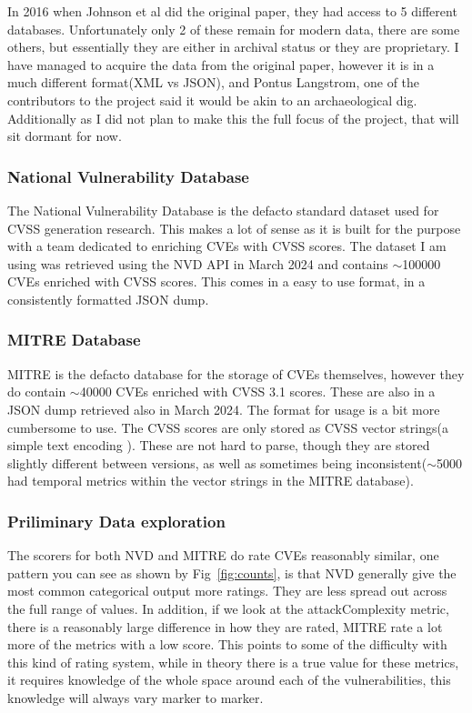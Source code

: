 \documentclass[12pt]{article}
\begin{document}
In 2016 when Johnson et al \cite{bayes} did the original paper, they had access to 5 different
databases. Unfortunately only 2 of these remain for modern data, there are some others, but
essentially they are either in archival status or they are proprietary. I have managed to acquire
the data from the original paper, however it is in a much different format(XML vs JSON), and Pontus
Langstrom, one of the contributors to the project said it would be akin to an archaeological dig.
Additionally as I did not plan to make this the full focus of the project, that will sit dormant for
now.

\subsubsection*{National Vulnerability Database}

The National Vulnerability Database is the defacto standard dataset used for CVSS generation
research. \cite{costa} \cite{nvd_example1} \cite{nvd_example2} This makes a lot of sense as it is built
for the purpose with a team dedicated to enriching CVEs with CVSS scores. The dataset I am using was
retrieved using the NVD API in March 2024 and contains $\sim$100000 CVEs enriched with CVSS scores. This
comes in a easy to use format, in a consistently formatted JSON dump.

\subsubsection*{MITRE Database}

MITRE is the defacto database for the storage of CVEs themselves, however they do contain $\sim$40000
CVEs enriched with CVSS 3.1 scores. These are also in a JSON dump retrieved also in March 2024. The
format for usage is a bit more cumbersome to use. The CVSS scores are only stored as CVSS vector
strings(a simple text encoding \cite{vector_string}). These are not hard to parse, though they are stored slightly
different between versions, as well as sometimes being inconsistent($\sim$5000 had temporal metrics within
the vector strings in the MITRE database).

\subsubsection{Priliminary Data exploration}

The scorers for both NVD and MITRE do rate CVEs reasonably similar, one pattern you can see as shown
by Fig~\ref{fig:counts}, is that NVD generally give the most common categorical output more ratings.
They are less spread out across the full range of values. In addition, if we look at the
attackComplexity metric, there is a reasonably large difference in how they are rated, MITRE rate a
lot more of the metrics with a low score. This points to some of the difficulty with this kind of
rating system, while in theory there is a true value for these metrics, it requires knowledge of the
whole space around each of the vulnerabilities, this knowledge will always vary marker to marker.
\end{document}
